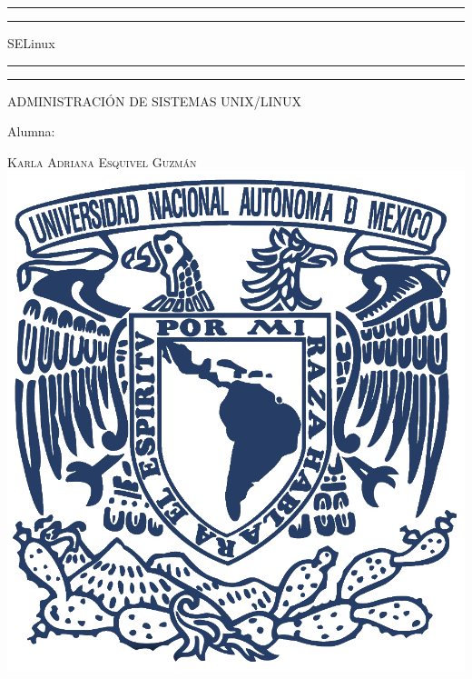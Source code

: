 \documentclass[a4paper, 11pt, oneside]{article}
\begin{document}
 

\begin{titlepage} 

	\centering 
	
	\scshape 
	
	\vspace*{\baselineskip} 
	
	
	
	\rule{\textwidth}{1.6pt}\vspace*{-\baselineskip}\vspace*{2pt} 
	\rule{\textwidth}{0.4pt} 
	
	\vspace{0.75\baselineskip} 
	
	{\LARGE SELinux}	
	\vspace{0.75\baselineskip} 
	
	\rule{\textwidth}{0.4pt}\vspace*{-\baselineskip}\vspace{3.2pt}
	\rule{\textwidth}{1.6pt} 
	
	\vspace{2\baselineskip} 
	

	ADMINISTRACIÓN DE SISTEMAS UNIX/LINUX
	
	\vspace*{3\baselineskip} 
	
	
	
	Alumna:
	
	\vspace{0.5\baselineskip} 
	
	{\scshape\Large Karla Adriana Esquivel Guzmán \\} 
	\vspace{0.5\baselineskip} 
	\vfill
	\includegraphics{unam.jpg}
	

\end{titlepage}
\end{document}
